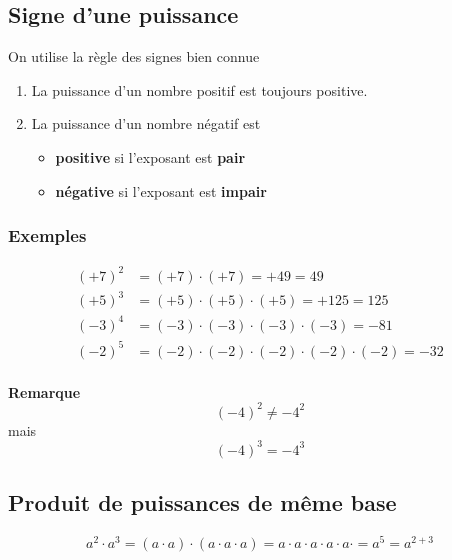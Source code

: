 \documentclass[
  12pt,
]{book}
\providecommand{\tightlist}{%
  \setlength{\itemsep}{0pt}\setlength{\parskip}{0pt}}
\begin{document}
\hypertarget{signe-dune-puissance}{%
\subsection{Signe d'une puissance}\label{signe-dune-puissance}}

On utilise la règle des signes bien connue

\begin{reglebox}

\begin{enumerate}
\def\labelenumi{\arabic{enumi}.}
\tightlist
\item
  La puissance d'un nombre positif est toujours positive.
\item
  La puissance d'un nombre négatif est

  \begin{itemize}
  \tightlist
  \item
    \textbf{positive} si l'exposant est \textbf{pair}
  \item
    \textbf{négative} si l'exposant est \textbf{impair}
  \end{itemize}
\end{enumerate}

\end{reglebox}

\hypertarget{exemples-1}{%
\subsubsection{Exemples}\label{exemples-1}}

\begin{align*}
 (+7)^2 & = (+7)\cdot(+7) = +49 = 49\\
 (+5)^3 & = (+5)\cdot(+5)\cdot (+5) = +125 = 125\\
 (-3)^4 & = (-3)\cdot(-3)\cdot(-3)\cdot(-3) = -81\\
 (-2)^5 & = (-2)\cdot(-2)\cdot(-2)\cdot(-2)\cdot(-2) = -32\\
\end{align*}

\textbf{Remarque}
\[(-4)^2\neq -4^2\] mais \[(-4)^3 = -4^3\]

\hypertarget{produit-de-puissances-de-muxeame-base}{%
\subsection{Produit de puissances de même base}\label{produit-de-puissances-de-muxeame-base}}

\[a^2\cdot a^3=(a\cdot a)\cdot(a\cdot a\cdot a)=a\cdot a\cdot a\cdot a\cdot a\cdot = a^5 = a^{2+3}\]
\end{document}
